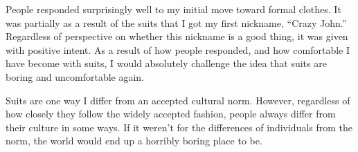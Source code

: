 \documentclass[12pt]{article}
\begin{document}
	People responded surprisingly well to my initial move
	toward formal clothes.  It was partially as a result of
	the suits that I got my first nickname, ``Crazy John.''
	Regardless of perspective on whether this nickname is
	a good thing, it was given with positive intent.  As a 
	result of how people responded, and how comfortable I
	have become with suits, I would absolutely challenge the
	idea that suits are boring and uncomfortable again.

	Suits are one way I differ from an accepted cultural 
	norm.  However, regardless of how closely they follow
	the widely accepted fashion, people always differ from
	their culture in some ways.  If it weren't for the
	differences of individuals from the norm, the world would
	end up a horribly boring place to be.  
\end{document}

